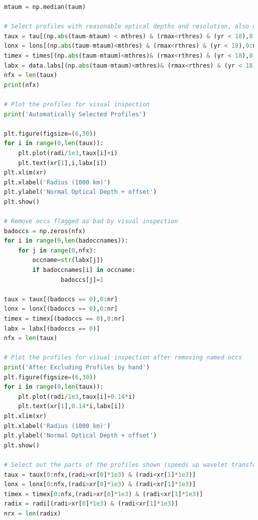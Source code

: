 \documentclass{article}
\begin{document}
\begin{lstlisting}[language=Python, caption=Python code snippet for Spiral Density Wave Analysis.]
mtaum = np.median(taum)

# Select profiles with reasonable optical depths and resolution, also can include cut on times here
taux = tau[(np.abs(taum-mtaum) < mthres) & (rmax<rthres) & (yr < 18),0:nr]
lonx = lons[(np.abs(taum-mtaum)<mthres) & (rmax<rthres) & (yr < 18),0:nr]
timex = times[(np.abs(taum-mtaum)<mthres)& (rmax<rthres) & (yr < 18),0:nr]
labx = data.labs[(np.abs(taum-mtaum)<mthres)& (rmax<rthres) & (yr < 18)]
nfx = len(taux)
print(nfx)

# Plot the profiles for visual inspection
print('Automatically Selected Profiles')

plt.figure(figsize=(6,30))
for i in range(0,len(taux)):
    plt.plot(radi/1e3,taux[i]+i)
    plt.text(xr[1],i,labx[i])
plt.xlim(xr)
plt.xlabel('Radius (1000 km)')
plt.ylabel('Normal Optical Depth + offset')
plt.show()

# Remove occs flagged as bad by visual inspection
badoccs = np.zeros(nfx)
for i in range(0,len(badoccnames)):
    for j in range(0,nfx):
        occname=str(labx[j])
        if badoccnames[i] in occname:
                badoccs[j]=1

taux = taux[(badoccs == 0),0:nr]
lonx = lonx[(badoccs == 0),0:nr]
timex = timex[(badoccs == 0),0:nr]
labx = labx[(badoccs == 0)]
nfx = len(taux)
                      
# Plot the profiles for visual inspection after removing named occs
print('After Excluding Profiles by hand')
plt.figure(figsize=(6,30))
for i in range(0,len(taux)):
    plt.plot(radi/1e3,taux[i]+0.14*i)
    plt.text(xr[1],0.14*i,labx[i])
plt.xlim(xr)
plt.xlabel('Radius (1000 km)')
plt.ylabel('Normal Optical Depth + offset')
plt.show()

# Select out the parts of the profiles shown (speeds up wavelet transforms)
taux = taux[0:nfx,(radi>xr[0]*1e3) & (radi<xr[1]*1e3)]
lonx = lonx[0:nfx,(radi>xr[0]*1e3) & (radi<xr[1]*1e3)]
timex = timex[0:nfx,(radi>xr[0]*1e3) & (radi<xr[1]*1e3)]
radix = radi[(radi>xr[0]*1e3) & (radi<xr[1]*1e3)]
nrx = len(radix)


\end{lstlisting}
\end{document}
